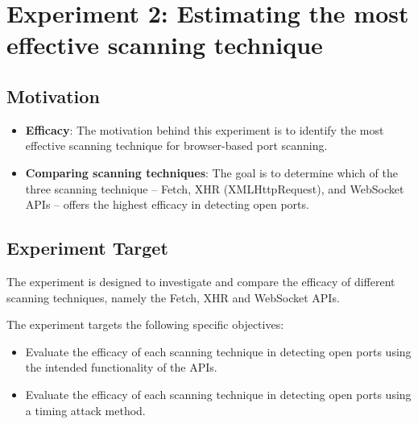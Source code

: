 \section{Experiment 2: Estimating the most effective scanning technique}

\subsection{Motivation}

\begin{itemize}
    \item \textbf{Efficacy}: The motivation behind this experiment is to identify the most effective scanning technique for browser-based port scanning.
    \item \textbf{Comparing scanning techniques}: The goal is to determine which of the three scanning technique -- Fetch, XHR (XMLHttpRequest), and WebSocket APIs -- offers the highest efficacy in detecting open ports.
\end{itemize}

\subsection{Experiment Target}

The experiment is designed to investigate and compare the efficacy of different scanning techniques, namely the Fetch, XHR and WebSocket APIs.

The experiment targets the following specific objectives:
\begin{itemize}
    \item Evaluate the efficacy of each scanning technique in detecting open ports using the intended functionality of the APIs.
    \item Evaluate the efficacy of each scanning technique in detecting open ports using a timing attack method.
\end{itemize}




